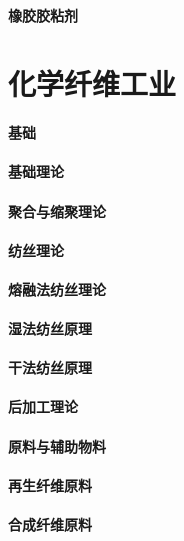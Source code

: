 \documentclass[UTF8]{../../ApplicationUniverse}
\begin{document}
\subsubsection{橡胶胶粘剂}





\chapter{化学纤维工业}
\subsubsection{基础}
    \subsubsection{基础理论}
        \subsubsection{聚合与缩聚理论}
        \subsubsection{纺丝理论}
            \subsubsection{熔融法纺丝理论}
            \subsubsection{湿法纺丝原理}
            \subsubsection{干法纺丝原理}
        \subsubsection{后加工理论}
    \subsubsection{原料与辅助物料}
        \subsubsection{再生纤维原料}
        \subsubsection{合成纤维原料}
\end{document}
